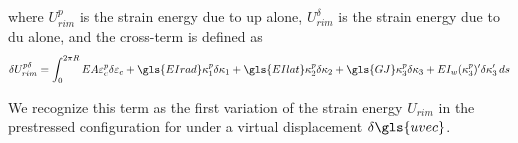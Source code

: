 \documentclass[\rootdir/thesis.tex]{subfiles}
\begin{document}
where $U_{rim}^p$ is the strain energy due to \gls{up} alone, $U_{rim}^{\delta}$ is the strain energy due to \gls{du} alone, and the cross-term is defined as
\begin{equation}
\label{eq:U_rim_pd}
\delta U_{rim}^{p\delta} = \int_0^{2\pi R}
	EA\varepsilon_c^p \delta\varepsilon_c +
	\gls{EIrad}\kappa_1^p\delta\kappa_1 +
	\gls{EIlat}\kappa_2^p\delta\kappa_2 +
	\gls{GJ}\kappa_3^p\delta\kappa_3 +
	EI_w(\kappa_3^p)'\delta\kappa_3'\, ds
\end{equation}

We recognize this term as the first variation of the strain energy $U_{rim}$ in the prestressed configuration for under a virtual displacement $\delta\gls{uvec}$.




\end{document}
